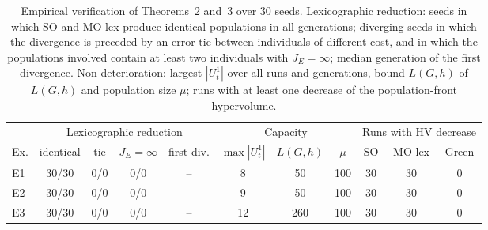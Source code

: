 \begin{table}[t]
\centering
\caption{Empirical verification of Theorems~2 and~3 over 30 seeds. Lexicographic reduction: seeds in which SO and MO-lex produce identical populations in all generations; diverging seeds in which the divergence is preceded by an error tie between individuals of different cost, and in which the populations involved contain at least two individuals with $J_E=\infty$; median generation of the first divergence. Non-deterioration: largest $|U_t^1|$ over all runs and generations, bound $L(G,h)$ of $L(G,h)$ and population size $\mu$; runs with at least one decrease of the population-front hypervolume.}
\label{tab:checks}
\small
\setlength{\tabcolsep}{4pt}
\begin{tabular}{lcccccccccc}
\toprule
 & \multicolumn{4}{c}{Lexicographic reduction} & \multicolumn{3}{c}{Capacity} & \multicolumn{3}{c}{Runs with HV decrease} \\
\cmidrule(lr){2-5}\cmidrule(lr){6-8}\cmidrule(lr){9-11}
Ex. & identical & tie & $J_E{=}\infty$ & first div. & $\max|U_t^1|$ & $L(G,h)$ & $\mu$ & SO & MO-lex & Green \\
\midrule
E1 & 30/30 & 0/0 & 0/0 & -- & 8 & 50 & 100 & 30 & 30 & 0 \\
E2 & 30/30 & 0/0 & 0/0 & -- & 9 & 50 & 100 & 30 & 30 & 0 \\
E3 & 30/30 & 0/0 & 0/0 & -- & 12 & 260 & 100 & 30 & 30 & 0 \\
\bottomrule
\end{tabular}
\end{table}
